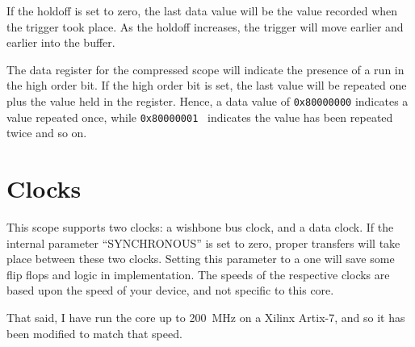 \documentclass{gqtekspec}
\begin{document}
If the holdoff is set to zero, the last data value will be the value recorded
when the trigger took place.  As the holdoff increases, the trigger will move
earlier and earlier into the buffer.

The data register for the compressed scope will indicate the presence of a 
run in the high order bit.  If the high order bit is set, the last value
will be repeated one plus the value held in the register.  Hence, a
data value of {\tt 0x80000000} indicates a value repeated once, while
{\tt 0x80000001 } indicates the value has been repeated twice and so on.
 
\chapter{Clocks}

This scope supports two clocks: a wishbone bus clock, and a data clock.
If the internal parameter ``SYNCHRONOUS'' is set to zero, proper transfers
will take place between these two clocks.  Setting this parameter to a one
will save some flip flops and logic in implementation.  The speeds of the
respective clocks are based upon the speed of your device, and not specific
to this core.

That said, I have run the core up to 200~MHz on a Xilinx Artix-7, and so
it has been modified to match that speed.
 
\end{document}
